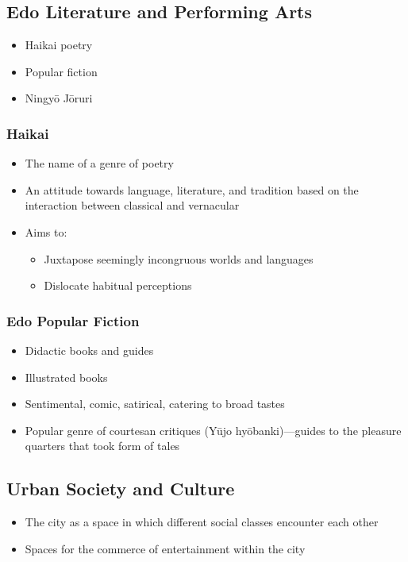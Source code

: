 \documentclass[class=article, crop=false]{standalone}
\begin{document}
  \subsection{Edo Literature and Performing Arts}
  \begin{itemize}
    \item Haikai poetry
    \item Popular fiction
    \item Ningy\=o J\=oruri
  \end{itemize}
  \subsubsection{Haikai}
  \begin{itemize}
    \item The name of a genre of poetry
    \item An attitude towards language, literature, and tradition based on the interaction between classical and vernacular
    \item Aims to:
    \begin{itemize}
      \item Juxtapose seemingly incongruous worlds and languages
      \item Dislocate habitual perceptions
    \end{itemize}
  \end{itemize}
  \subsubsection{Edo Popular Fiction}
  \begin{itemize}
    \item Didactic books and guides
    \item Illustrated books
    \item Sentimental, comic, satirical, catering to broad tastes
    \item Popular genre of courtesan critiques (Y\=ujo hy\=obanki)---guides to the pleasure quarters that took form of tales
  \end{itemize}
  \subsection{Urban Society and Culture}
  \begin{itemize}
    \item The city as a space in which different social classes encounter each other
    \item Spaces for the commerce of entertainment within the city
  \end{itemize}
\end{document}
